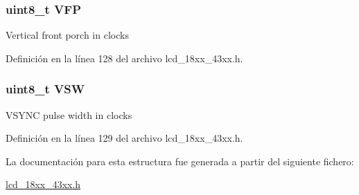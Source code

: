 \subsubsection[{\texorpdfstring{V\+FP}{VFP}}]{\setlength{\rightskip}{0pt plus 5cm}uint8\+\_\+t V\+FP}\hypertarget{struct_l_c_d___c_o_n_f_i_g___t_ad1c0cbe37f4472325d18a677fca84e47}{}\label{struct_l_c_d___c_o_n_f_i_g___t_ad1c0cbe37f4472325d18a677fca84e47}
Vertical front porch in clocks 

Definición en la línea 128 del archivo lcd\+\_\+18xx\+\_\+43xx.\+h.

\subsubsection[{\texorpdfstring{V\+SW}{VSW}}]{\setlength{\rightskip}{0pt plus 5cm}uint8\+\_\+t V\+SW}\hypertarget{struct_l_c_d___c_o_n_f_i_g___t_a6d83cd61df80c52bbb771d3ff818d6b7}{}\label{struct_l_c_d___c_o_n_f_i_g___t_a6d83cd61df80c52bbb771d3ff818d6b7}
V\+S\+Y\+NC pulse width in clocks 

Definición en la línea 129 del archivo lcd\+\_\+18xx\+\_\+43xx.\+h.



La documentación para esta estructura fue generada a partir del siguiente fichero\+:\begin{DoxyCompactItemize}
\item 
\hyperlink{lcd__18xx__43xx_8h}{lcd\+\_\+18xx\+\_\+43xx.\+h}\end{DoxyCompactItemize}
